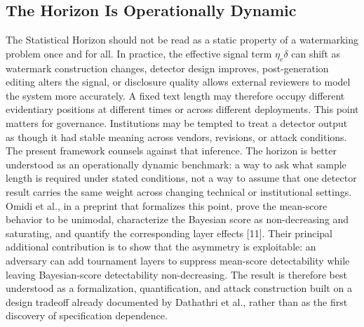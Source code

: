 \documentclass[11pt]{article}
\begin{document}
\subsection{The Horizon Is Operationally Dynamic}
The Statistical Horizon should not be read as a static property of a watermarking
problem once and for all. In practice, the effective signal term $\eta_e\delta$ can
shift as watermark construction changes, detector design improves, post-generation
editing alters the signal, or disclosure quality allows external reviewers to model
the system more accurately. A fixed text length may therefore occupy different
evidentiary positions at different times or across different deployments.
This point matters for governance. Institutions may be tempted to treat a detector
output as though it had stable meaning across vendors, revisions, or attack
conditions. The present framework counsels against that inference. The horizon is
better understood as an operationally dynamic benchmark: a way to ask what sample
length is required under stated conditions, not a way to assume that one detector
result carries the same weight across changing technical or institutional settings.
Omidi et al., in a preprint that formalizes this point, prove the mean-score
behavior to be unimodal, characterize the Bayesian score as non-decreasing and
saturating, and quantify the corresponding layer effects [11]. Their principal
additional contribution is to show that the asymmetry is exploitable: an adversary
can add tournament layers to suppress mean-score detectability while leaving
Bayesian-score detectability non-decreasing. The result is therefore best
understood as a formalization, quantification, and attack construction built on a
design tradeoff already documented by Dathathri et al., rather than as the first
discovery of specification dependence.
\end{document}
